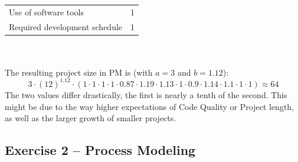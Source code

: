 \documentclass{scrartcl}
\begin{document}
\begin{itemize}
\begin{tabular}{l | c}
		Use of software tools & 1\\
		Required development schedule & 1\\
	\end{tabular}\\\\
	The resulting project size in PM is (with $a=3$ and $b=1.12$):
	\[3 \cdot (12)^{1.12}\cdot (1\cdot 1 \cdot 1 \cdot 1 \cdot 0.87 \cdot 1.19 \cdot 1.13 \cdot 1 \cdot 0.9 \cdot 1.14 \cdot 1.1 \cdot 1 \cdot 1) \approx 64\]
	The two values differ drastically, the first is nearly a tenth of the second.
        This might be due to the way higher expectations of Code Quality or Project length, as well as the larger growth of smaller projects.
\end{itemize}

\subsection*{Exercise 2 – Process Modeling}
\end{document}
